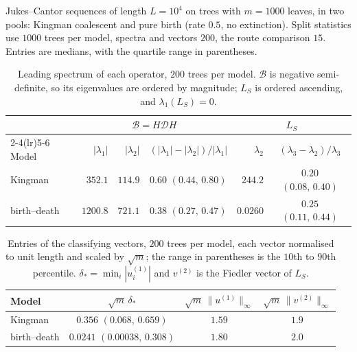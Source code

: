 \documentclass[11pt]{article}
\begin{document}

Jukes--Cantor sequences of length $L = 10^4$ on trees with $m = 1000$ leaves, in two pools:
Kingman coalescent and pure birth (rate $0.5$, no extinction). Split statistics use $1000$
trees per model, spectra and vectors $200$, the route comparison $15$. Entries are medians,
with the quartile range in parentheses.

\begin{table}[H]
\centering
\begin{tabular}{@{}lrrcrc@{}}
\toprule
& \multicolumn{3}{c}{$\mathcal{B} = H\mathcal{D}H$} & \multicolumn{2}{c}{$L_S$} \\
\cmidrule(lr){2-4}\cmidrule(lr){5-6}
Model & $|\lambda_1|$ & $|\lambda_2|$ & $(|\lambda_1|-|\lambda_2|)/|\lambda_1|$
      & $\lambda_2$ & $(\lambda_3-\lambda_2)/\lambda_3$ \\
\midrule
Kingman      & $352.1$  & $114.9$ & $0.60$ $(0.44,\,0.80)$ & $244.2$   & $0.20$ $(0.08,\,0.40)$ \\
birth--death & $1200.8$ & $721.1$ & $0.38$ $(0.27,\,0.47)$ & $0.0260$  & $0.25$ $(0.11,\,0.44)$ \\
\bottomrule
\end{tabular}
\caption{Leading spectrum of each operator, $200$ trees per model. $\mathcal{B}$ is
negative semi-definite, so its eigenvalues are ordered by magnitude; $L_S$ is ordered
ascending, and $\lambda_1(L_S) = 0$.}
\label{tab:app-spectrum}
\end{table}

\begin{table}[H]
\centering
\begin{tabular}{@{}lccc@{}}
\toprule
Model & $\sqrt{m}\,\delta_*$ & $\sqrt{m}\,\|u^{(1)}\|_\infty$ & $\sqrt{m}\,\|v^{(2)}\|_\infty$ \\
\midrule
Kingman      & $0.356$  $(0.068,\,0.659)$   & $1.59$ & $1.9$ \\
birth--death & $0.0241$ $(0.00038,\,0.308)$ & $1.80$ & $2.0$ \\
\bottomrule
\end{tabular}
\caption{Entries of the classifying vectors, $200$ trees per model, each vector normalised
to unit length and scaled by $\sqrt{m}$; the range in parentheses is the $10$th to $90$th
percentile. $\delta_* = \min_i |u^{(1)}_i|$ and $v^{(2)}$ is the Fiedler vector of $L_S$.}
\label{tab:app-vectors}
\end{table}
\end{document}
